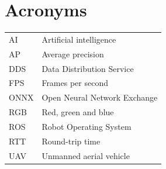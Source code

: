 \chapter*{Acronyms}
\begin{tabularx}{\textwidth}{lX}
\toprule AI & Artificial intelligence\\ AP & Average precision\\ DDS & Data Distribution Service\\ FPS & Frames per second\\ ONNX & Open Neural Network Exchange\\ RGB & Red, green and blue\\ ROS & Robot Operating System\\ RTT & Round-trip time\\ UAV & Unmanned aerial vehicle\\ \bottomrule
\end{tabularx}

